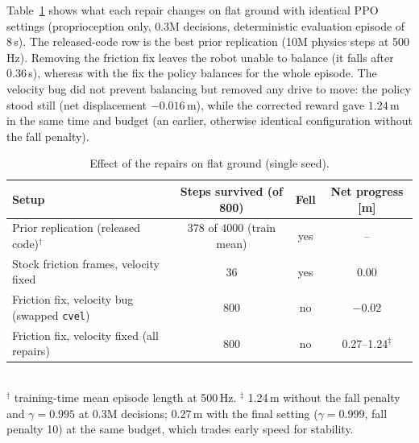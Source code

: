 Table~\ref{tab:abl} shows what each repair changes on flat ground with identical PPO settings (proprioception only, 0.3M decisions, deterministic evaluation episode of 8\,s). The released-code row is the best prior replication (10M physics steps at 500\,Hz). Removing the friction fix leaves the robot unable to balance (it falls after 0.36\,s), whereas with the fix the policy balances for the whole episode. The velocity bug did not prevent balancing but removed any drive to move: the policy stood still (net displacement $-0.016$\,m), while the corrected reward gave $1.24$\,m in the same time and budget (an earlier, otherwise identical configuration without the fall penalty).

\begin{table}[t]
\centering\caption{Effect of the repairs on flat ground (single seed).}\label{tab:abl}
\scriptsize\begin{tabular}{lccc}\toprule
Setup & Steps survived (of 800) & Fell & Net progress [m]\\ \midrule
Prior replication (released code)$^\dagger$ & 378 of 4000 (train mean) & yes & --\\
Stock friction frames, velocity fixed & 36 & yes & 0.00\\
Friction fix, velocity bug (swapped \texttt{cvel}) & 800 & no & $-0.02$\\
Friction fix, velocity fixed (all repairs) & 800 & no & 0.27--1.24$^\ddagger$\\ \bottomrule
\end{tabular}\\[2pt]
{\scriptsize $^\dagger$ training-time mean episode length at 500\,Hz. $^\ddagger$ 1.24\,m without the fall penalty and $\gamma{=}0.995$ at 0.3M decisions; 0.27\,m with the final setting ($\gamma{=}0.999$, fall penalty 10) at the same budget, which trades early speed for stability.}
\end{table}
